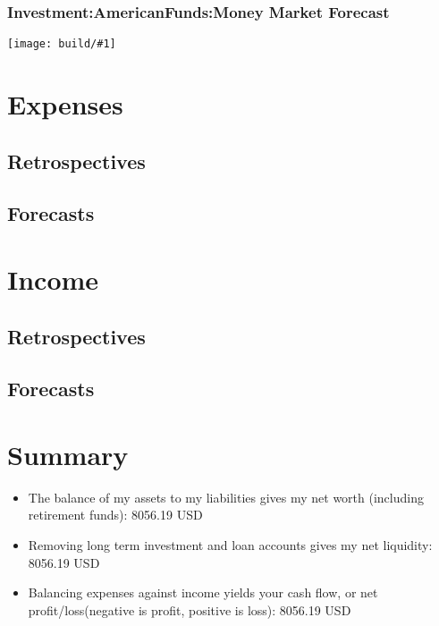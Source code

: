 \documentclass[pdftex,12pt,letterpaper]{report}
\newcommand{\insertplot}[1]{\texttt{[image: build/\#1]}\\[1cm]}
\begin{document}
\subsection{Investment:AmericanFunds:Money Market Forecast}
\insertplot{Assets:Investment:AmericanFunds:MoneyMarketforecast}
\chapter{Expenses}
\section{Retrospectives}
\section{Forecasts}
\chapter{Income}
\section{Retrospectives}
\section{Forecasts}

\chapter{Summary}

\begin{itemize}

\item The balance of my assets to my liabilities gives my net worth (including retirement funds): 8056.19 USD
\item Removing long term investment and loan accounts gives my net liquidity: 8056.19 USD
\item Balancing expenses against income yields your cash flow, or net profit/loss(negative is profit, positive is loss): 8056.19 USD

\end{itemize}
\end{document}
